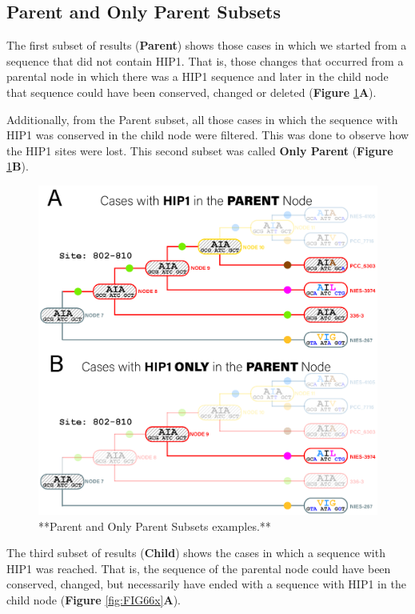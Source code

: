 \documentclass[
]{book}
\begin{document}
\hypertarget{parent-and-only-parent-subsets}{%
\subsection{Parent and Only Parent Subsets}\label{parent-and-only-parent-subsets}}

The first subset of results (\textbf{Parent}) shows those cases in which we started from a sequence that did not contain HIP1. That is, those changes that occurred from a parental node in which there was a HIP1 sequence and later in the child node that sequence could have been conserved, changed or deleted (\textbf{Figure} \ref{fig:FIG6x}\textbf{A}).

Additionally, from the Parent subset, all those cases in which the sequence with HIP1 was conserved in the child node were filtered. This was done to observe how the HIP1 sites were lost. This second subset was called \textbf{Only Parent} (\textbf{Figure} \ref{fig:FIG6x}\textbf{B}).

\begin{figure}
\includegraphics[width=1\linewidth]{figures/4x/Node_cases_A} \caption{**Parent and Only Parent Subsets examples.**}\label{fig:FIG6x}
\end{figure}

The third subset of results (\textbf{Child}) shows the cases in which a sequence with HIP1 was reached. That is, the sequence of the parental node could have been conserved, changed, but necessarily have ended with a sequence with HIP1 in the child node (\textbf{Figure} \ref{fig:FIG66x}\textbf{A}).
\end{document}
